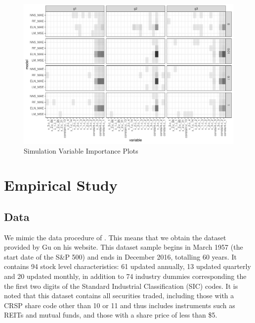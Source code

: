 \documentclass[11pt, a4paper, table]{article}
\begin{document}
\begin{figure}
	\caption{Simulation Variable Importance Plots}
	\begin{center}
		\includegraphics{simulation_ave_vi_plot.pdf}
	\end{center}
\end{figure}


\section{Empirical Study}

\subsection{Data}

We mimic the data procedure of \cite{gu_empirical_2018}. This means that we obtain the dataset provided by Gu on his website. This dataset sample begins in March 1957 (the start date of the S\&P 500) and ends in December 2016, totalling 60 years. It contains 94 stock level characteristics: 61 updated annually, 13 updated quarterly and 20 updated monthly, in addition to 74 industry dummies corresponding the the first two digits of the Standard Industrial Classification (SIC) codes. It is noted that this dataset contains all securities traded, including those with a CRSP share code other than 10 or 11 and thus includes instruments such as REITs and mutual funds, and those with a share price of less than \$5.
\end{document}
